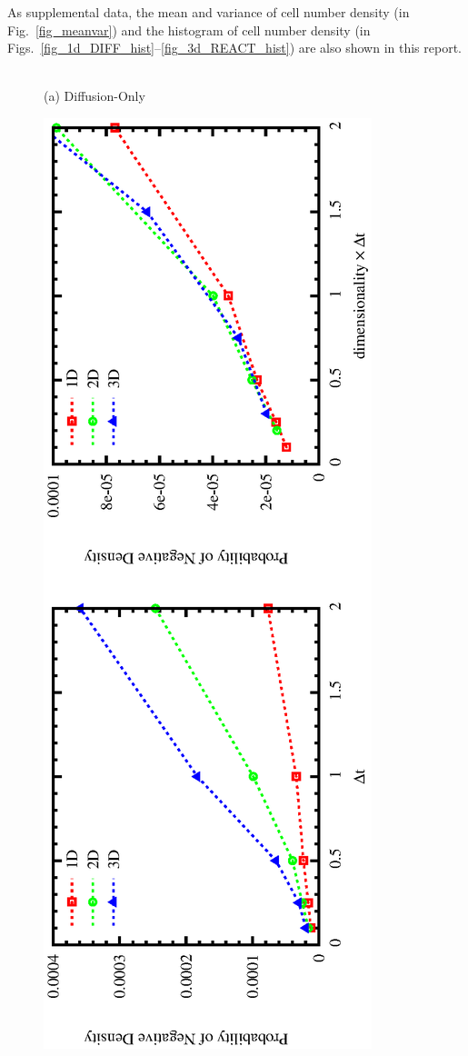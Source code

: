 \documentclass{article}
\begin{document}
As supplemental data, the mean and variance of cell number density (in Fig.~\ref{fig_meanvar}) and the histogram of cell number density (in Figs.~\ref{fig_1d_DIFF_hist}--\ref{fig_3d_REACT_hist}) are also shown in this report.

\begin{figure}
\begin{center}
\\
\vspace{5mm}
(a) Diffusion-Only
\vspace{-5mm}
\end{center}
\includegraphics[angle=270,width=\linewidth]{fig1/negdens_diff.eps}

\end{figure}
\end{document}
